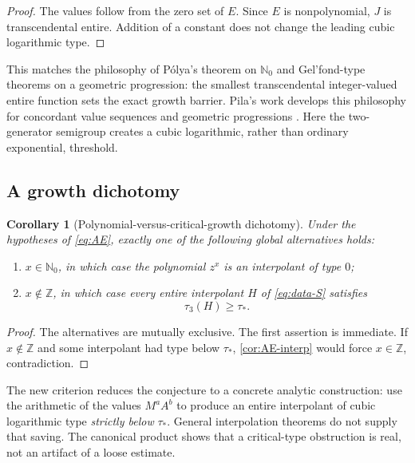 \documentclass[11pt,oneside]{article}
\newtheorem{corollary}[theorem]{Corollary}
\theoremstyle{definition}
\theoremstyle{remark}
\newcommand{\Nzero}{\mathbb N_0}
\newcommand{\Z}{\mathbb Z}
\begin{document}
\begin{proof}
The values follow from the zero set of \(E\).  Since \(E\) is nonpolynomial, \(J\) is transcendental entire.  Addition of a constant does not change the leading cubic logarithmic type.
\end{proof}

This matches the philosophy of P\'olya's theorem on \(\Nzero\) and Gel'fond-type theorems on a geometric progression: the smallest transcendental integer-valued entire function sets the exact growth barrier.  Pila's work develops this philosophy for concordant value sequences and geometric progressions \cite{Pila2003}.  Here the two-generator semigroup creates a cubic logarithmic, rather than ordinary exponential, threshold.

\subsection{A growth dichotomy}

\begin{corollary}[Polynomial-versus-critical-growth dichotomy]
\label{cor:growth-dichotomy}
Under the hypotheses of \eqref{eq:AE}, exactly one of the following global alternatives holds:
\begin{enumerate}[label=(\roman*)]
\item \(x\in\Nzero\), in which case the polynomial \(z^x\) is an interpolant of type \(0\);
\item \(x\notin\Z\), in which case every entire interpolant \(H\) of \eqref{eq:data-S} satisfies
\[
  \tau_3(H)\ge\tau_*.
\]
\end{enumerate}
\end{corollary}

\begin{proof}
The alternatives are mutually exclusive.  The first assertion is immediate.  If \(x\notin\Z\) and some interpolant had type below \(\tau_*\), \cref{cor:AE-interp} would force \(x\in\Z\), contradiction.
\end{proof}

\begin{gapbox}
The new criterion reduces the conjecture to a concrete analytic construction: use the arithmetic of the values \(M^aA^b\) to produce an entire interpolant of cubic logarithmic type \emph{strictly below} \(\tau_*\).  General interpolation theorems do not supply that saving.  The canonical product shows that a critical-type obstruction is real, not an artifact of a loose estimate.
\end{gapbox}
\end{document}
